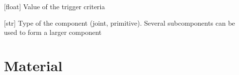 \documentclass[letterpaper,10pt,english]{sphinxmanual}
\begin{document}
\begin{fulllineitems}
\begin{fulllineitems}
\label{\detokenize{modules:component.Component.trigger_value}}
\pysigstartsignatures
{}
\pysigstopsignatures
\sphinxAtStartPar
{[}float{]} Value of the trigger criteria

\end{fulllineitems}


\begin{fulllineitems}
\label{\detokenize{modules:component.Component.type}}
\pysigstartsignatures
{}
\pysigstopsignatures
\sphinxAtStartPar
{[}str{]} Type of the component (joint, primitive). Several sub\sphinxhyphen{}components can be used to form a larger component

\end{fulllineitems}


\end{fulllineitems}



\section{Material}
\label{\detokenize{modules:material}}
\end{document}
